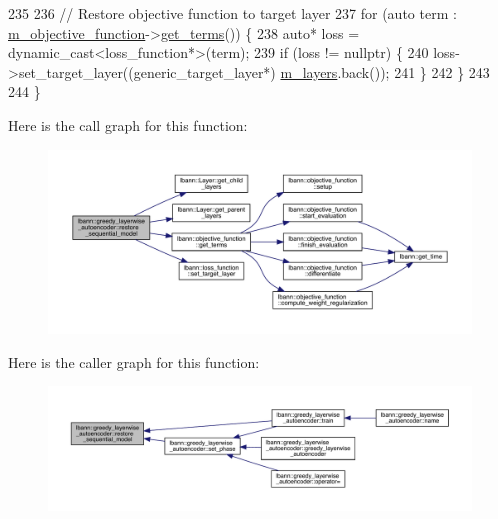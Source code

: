 \begin{DoxyCode}
235 
236   \textcolor{comment}{// Restore objective function to target layer}
237   \textcolor{keywordflow}{for} (\textcolor{keyword}{auto} term : \hyperlink{classlbann_1_1model_a24c50e7108dd7698671aed7df5b22e8b}{m\_objective\_function}->\hyperlink{classlbann_1_1objective__function_a510544e9e511be54a50efd39226de345}{get\_terms}()) \{
238     \textcolor{keyword}{auto}* loss = \textcolor{keyword}{dynamic\_cast<}loss\_function*\textcolor{keyword}{>}(term);
239     \textcolor{keywordflow}{if} (loss != \textcolor{keyword}{nullptr}) \{
240       loss->set\_target\_layer((generic\_target\_layer*) \hyperlink{classlbann_1_1model_a0229fc226ec163d1411548446104569d}{m\_layers}.back());
241     \}
242   \}
243 
244 \}
\end{DoxyCode}
Here is the call graph for this function\+:\nopagebreak
\begin{figure}[H]
\begin{center}
\leavevmode
\includegraphics[width=350pt]{classlbann_1_1greedy__layerwise__autoencoder_a82b8ced756904a2423a65cd0e329b4e2_cgraph}
\end{center}
\end{figure}
Here is the caller graph for this function\+:\nopagebreak
\begin{figure}[H]
\begin{center}
\leavevmode
\includegraphics[width=350pt]{classlbann_1_1greedy__layerwise__autoencoder_a82b8ced756904a2423a65cd0e329b4e2_icgraph}
\end{center}
\end{figure}
\mbox{\label{classlbann_1_1greedy__layerwise__autoencoder_a5f237f1f6285475c5493a7d15dc32096}} 
